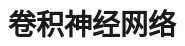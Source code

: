 \setcounter{chapter}{2}

\hypertarget{ux5377ux79efux795eux7ecfux7f51ux7edc}{%
\chapter{卷积神经网络}\label{ux5377ux79efux795eux7ecfux7f51ux7edc}}
